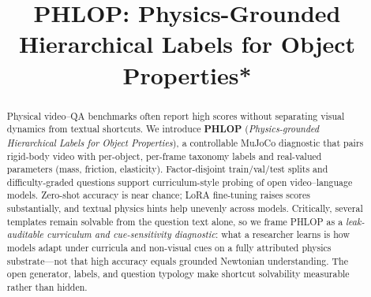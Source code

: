 \documentclass[conference]{IEEEtran}
\begin{document}
\title{\textbf{PHLOP}: \textbf{P}hysics-Grounded \textbf{H}ierarchical \textbf{L}abels for \textbf{O}bject
\textbf{P}roperties*\\
}

\author{


}

\maketitle

\begin{abstract}
Physical video--QA benchmarks often report high scores without separating visual dynamics from textual shortcuts. We introduce \textbf{PHLOP} (\textit{Physics-grounded Hierarchical Labels for Object Properties}), a controllable MuJoCo diagnostic that pairs rigid-body video with per-object, per-frame taxonomy labels and real-valued parameters (mass, friction, elasticity). Factor-disjoint train/val/test splits and difficulty-graded questions support curriculum-style probing of open video--language models. Zero-shot accuracy is near chance; LoRA fine-tuning raises scores substantially, and textual physics hints help unevenly across models. Critically, several templates remain solvable from the question text alone, so we frame PHLOP as a \emph{leak-auditable curriculum and cue-sensitivity diagnostic}: what a researcher learns is how models adapt under curricula and non-visual cues on a fully attributed physics substrate---not that high accuracy equals grounded Newtonian understanding. The open generator, labels, and question typology make shortcut solvability measurable rather than hidden.
\end{abstract}
\end{document}
